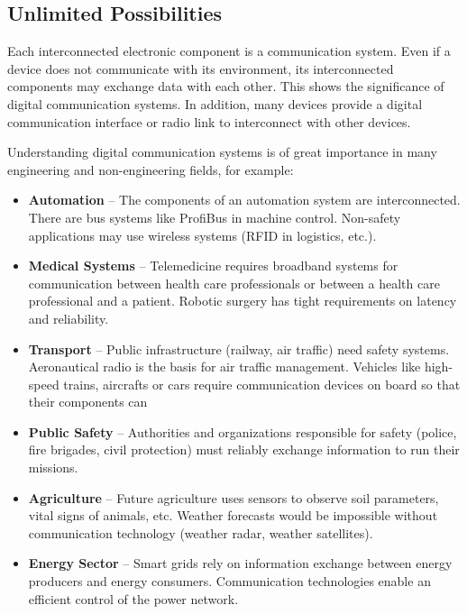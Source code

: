 \begin{refsection}
\section*{Unlimited Possibilities}

Each interconnected electronic component is a communication system. Even if a device does not communicate with its environment, its interconnected components may exchange data with each other. This shows the significance of digital communication systems. In addition, many devices provide a digital communication interface or radio link to interconnect with other devices.

Understanding digital communication systems is of great importance in many engineering and non-engineering fields, for example:
\begin{itemize}
	\item \textbf{Automation} -- The components of an automation system are interconnected. There are bus systems like ProfiBus in machine control. Non-safety applications may use wireless systems (RFID in logistics, etc.).
	\item \textbf{Medical Systems} -- Telemedicine requires broadband systems for communication between health care professionals or between a health care professional and a patient. Robotic surgery has tight requirements on latency and reliability.
	\item \textbf{Transport} -- Public infrastructure (railway, air traffic) need safety systems. Aeronautical radio is the basis for air traffic management. Vehicles like high-speed trains, aircrafts or cars require communication devices on board so that their components can 
	\item \textbf{Public Safety} -- Authorities and organizations responsible for safety (police, fire brigades, civil protection) must reliably exchange information to run their missions.
	\item \textbf{Agriculture} -- Future agriculture uses sensors to observe soil parameters, vital signs of animals, etc. Weather forecasts would be impossible without communication technology (weather radar, weather satellites).
	\item \textbf{Energy Sector} -- Smart grids rely on information exchange between energy producers and energy consumers. Communication technologies enable an efficient control of the power network.
\end{itemize}

\printbibliography[heading=subbibliography]
\end{refsection}
